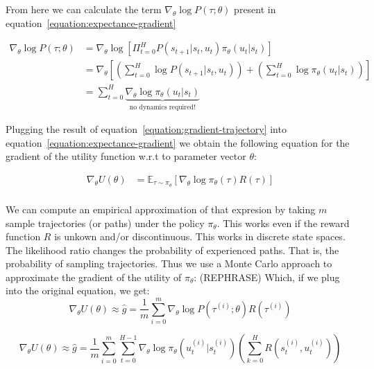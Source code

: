 \documentclass{../main.tex}{subfiles}
\begin{document}
From here we can calculate the term $\nabla_{\theta} \log P(\tau ; \theta)$ present in equation~\ref{equation:expectance-gradient}

\begin{equation}\label{equation:gradient-trajectory}
\begin{aligned}
\nabla_{\theta} \log P(\tau ; \theta) & = \nabla_{\theta} \log [\Pi_{t=0}^{H} P(s_{t+1} | s_t, u_t) \pi_{\theta}(u_t | s_t)] \\
 & = \nabla_{\theta} [(\sum_{t=0}^{H} \log P(s_{t+1} | s_t, u_t)) + (\sum_{t=0}^{H} \log \pi_{\theta}(u_t | s_t))] \\ 
 & = \sum_{t=0}^{H} \underbrace{\nabla_{\theta} \log \pi_{\theta}(u_t | s_t)}_\textrm{no dynamics required!}
\end{aligned}
\end{equation}

Plugging the result of equation~\ref{equation:gradient-trajectory} into equation~\ref{equation:expectance-gradient} we obtain the following equation for the gradient of the utility function w.r.t to parameter vector $\theta$:

\begin{equation}
\begin{aligned}
\nabla_{\theta} U(\theta) & = \mathbb{E}_{\tau \sim \pi_{\theta}} [\nabla_{\theta} \log \pi_{\theta}(\tau) R(\tau)] \\
\end{aligned}
\end{equation}

We can compute an empirical approximation of that expresion by taking $m$ sample trajectories (or paths) under the policy $\pi_{\theta}$. This works even if the reward function $R$ is unkown and/or discontinuous. This works in discrete state spaces. The likelihood ratio changes the probability of experienced paths. That is, the probability of sampling trajectories. Thus we use a Monte Carlo approach to approximate the gradient of the utility of $\pi_{\theta}$: (REPHRASE)
Which, if we plug into the original equation, we get:
\begin{equation}\label{equation:expectance-gradient-vanilla}
\nabla_{\theta}U(\theta) \approx \hat{g} = \frac{1}{m} \sum_{i = 0}^{m} \nabla_{\theta} \log P(\tau^{(i)} ; \theta) R(\tau^{(i)})
\end{equation}

\begin{equation}
\nabla_{\theta}U(\theta) \approx \hat{g} = \frac{1}{m} \sum_{i = 0}^{m} \sum_{t=0}^{H-1} \nabla_{\theta} \log \pi_{\theta}(u_t^{(i)} | s_t^{(i)}) (\sum_{k=0}^{H}R(s_t^{(i)}, u_t^{(i)}))
\end{equation}
\end{document}
